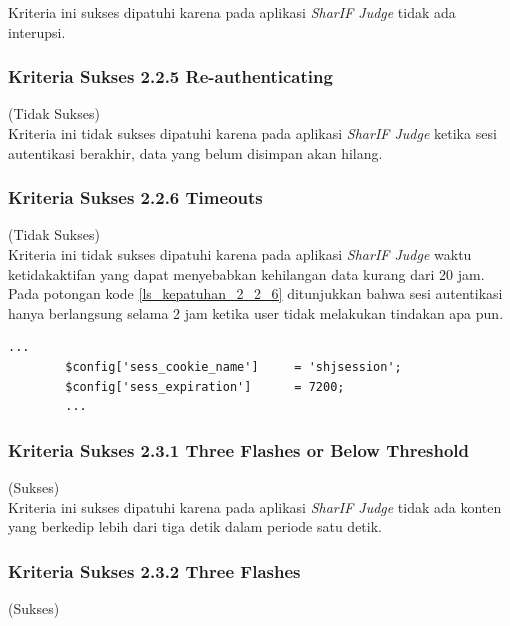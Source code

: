 \documentclass[a4paper,twoside]{article}
\begin{document}
\begin{enumerate}
		Kriteria ini sukses dipatuhi karena pada aplikasi \textit{SharIF Judge} tidak ada interupsi.
		
		\subsubsection*{Kriteria Sukses 2.2.5 Re-authenticating}
		\label{subsubsec:kepatuhan_kriteria_2.2.5}
		(Tidak Sukses) \\
		
		Kriteria ini tidak sukses dipatuhi karena pada aplikasi \textit{SharIF Judge} ketika sesi autentikasi berakhir, data yang belum disimpan akan hilang.
		
		\subsubsection*{Kriteria Sukses 2.2.6 Timeouts}
		\label{subsubsec:kepatuhan_kriteria_2.2.6}
		(Tidak Sukses) \\
		
		Kriteria ini tidak sukses dipatuhi karena pada aplikasi \textit{SharIF Judge} waktu ketidakaktifan yang dapat menyebabkan kehilangan data kurang dari 20 jam. Pada potongan kode \ref{ls_kepatuhan_2_2_6} ditunjukkan bahwa sesi autentikasi hanya berlangsung selama 2 jam ketika user tidak melakukan tindakan apa pun.
		\begin{lstlisting}[basicstyle=\ttfamily, frame=single,
		columns=fullflexible, keepspaces=true, breaklines=true, label=ls_kepatuhan_2_2_6, caption=Kriteria Sukses 2.2.6 - Sesi Autentikasi]
		...
		$config['sess_cookie_name']		= 'shjsession';
		$config['sess_expiration']		= 7200;
		...
		\end{lstlisting}
		
		\subsubsection*{Kriteria Sukses 2.3.1 Three Flashes or Below Threshold}
		\label{subsubsec:kepatuhan_kriteria_2.3.1}
		(Sukses)\\
		
		Kriteria ini sukses dipatuhi karena pada aplikasi \textit{SharIF Judge} tidak ada konten yang berkedip lebih dari tiga detik dalam periode satu detik.
		
		\subsubsection*{Kriteria Sukses 2.3.2 Three Flashes}
		\label{subsubsec:kepatuhan_kriteria_2.3.2}
		(Sukses) \\
		

\end{enumerate}
\end{document}
